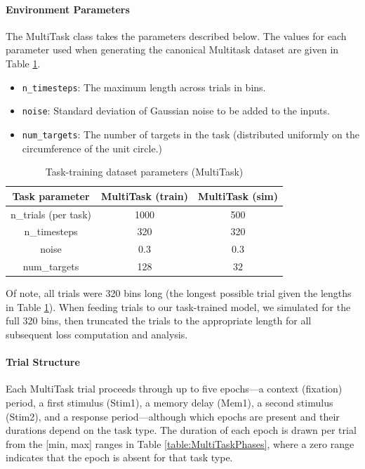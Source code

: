 \documentclass{article}
\begin{document}
\paragraph{Environment Parameters}
The MultiTask class takes the parameters described below. The values for each parameter used when generating the canonical Multitask dataset are given in Table \ref{table:MultiTaskTrain}.
\begin{itemize}
    \item \texttt{n\_timesteps}: The maximum length across trials in bins.
    \item \texttt{noise}: Standard deviation of Gaussian noise to be added to the inputs.
    \item \texttt{num\_targets}: The number of targets in the task (distributed uniformly on the circumference of the unit circle.)
\end{itemize}
\begin{table}[ht]
\centering
\begin{tabular}{|c|c|c|}
\hline
\textbf{Task parameter} & \textbf{MultiTask (train)} &  \textbf{MultiTask (sim)}  \\ \hline
n\_trials (per task) &  1000 & 500  \\ \hline
n\_timesteps &  320 & 320  \\ \hline
noise &  0.3 & 0.3 \\ \hline
num\_targets & 128 & 32 \\ \hline
\end{tabular}
\caption{Task-training dataset parameters (MultiTask)}
\label{table:MultiTaskTrain}
\end{table}

Of note, all trials were 320 bins long (the longest possible trial given the lengths in Table \ref{table:MultiTaskTrain}). When feeding trials to our task-trained model, we simulated for the full 320 bins, then truncated the trials to the appropriate length for all subsequent loss computation and analysis.

\paragraph{Trial Structure}
Each MultiTask trial proceeds through up to five epochs---a context (fixation) period, a first stimulus (Stim1), a memory delay (Mem1), a second stimulus (Stim2), and a response period---although which epochs are present and their durations depend on the task type. The duration of each epoch is drawn per trial from the [min, max] ranges in Table \ref{table:MultiTaskPhases}, where a zero range indicates that the epoch is absent for that task type.
\end{document}
